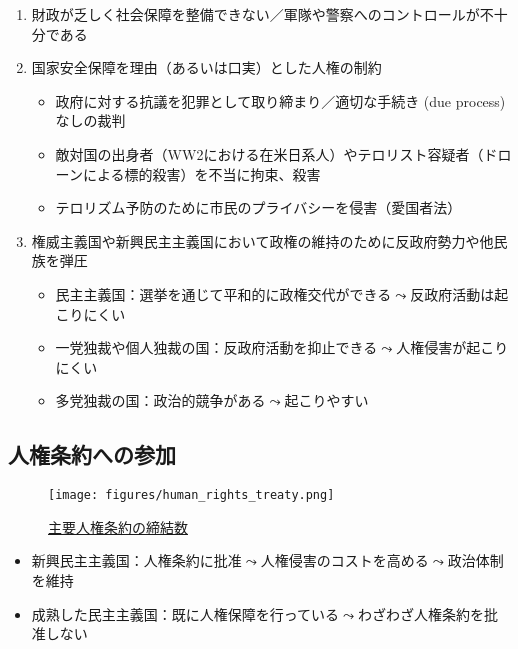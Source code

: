 \documentclass[
  xelatex,
  ja=standard]{bxjsarticle}
\providecommand{\tightlist}{%
  \setlength{\itemsep}{0pt}\setlength{\parskip}{0pt}}\usepackage{longtable,booktabs,array}
\begin{document}
\begin{enumerate}
\def\labelenumi{\arabic{enumi}.}
\tightlist
\item
  財政が乏しく社会保障を整備できない／軍隊や警察へのコントロールが不十分である\citep{cole2015}
\item
  国家安全保障を理由（あるいは口実）とした人権の制約\citep{poe1994, krain1997}

  \begin{itemize}
  \tightlist
  \item
    政府に対する抗議を犯罪として取り締まり／適切な手続き (due process)
    なしの裁判
  \item
    敵対国の出身者（WW2における在米日系人）やテロリスト容疑者（ドローンによる標的殺害）を不当に拘束、殺害
  \item
    テロリズム予防のために市民のプライバシーを侵害（愛国者法）
  \end{itemize}
\item
  権威主義国や新興民主主義国\citep{davenport1995}において政権の維持のために反政府勢力や他民族を弾圧

  \begin{itemize}
  \tightlist
  \item
    民主主義国：選挙を通じて平和的に政権交代ができる\(\leadsto\)反政府活動は起こりにくい
  \item
    一党独裁や個人独裁の国：反政府活動を抑止できる\(\leadsto\)人権侵害が起こりにくい
  \item
    多党独裁の国：政治的競争がある\(\leadsto\)起こりやすい\citep{vreeland2008}
  \end{itemize}
\end{enumerate}

\hypertarget{ux4ebaux6a29ux6761ux7d04ux3078ux306eux53c2ux52a0}{%
\subsection{人権条約への参加}\label{ux4ebaux6a29ux6761ux7d04ux3078ux306eux53c2ux52a0}}

\begin{figure}[htpb]

{\centering \texttt{[image: figures/human\_rights\_treaty.png]}

}

\caption{\href{https://indicators.ohchr.org}{主要人権条約の締結数}}

\end{figure}

\begin{itemize}
\tightlist
\item
  新興民主主義国：人権条約に批准\(\leadsto\)人権侵害のコストを高める\(\leadsto\)政治体制を維持\citep{moravcsik2000}
\item
  成熟した民主主義国：既に人権保障を行っている\(\leadsto\)わざわざ人権条約を批准しない
\end{itemize}
\end{document}
